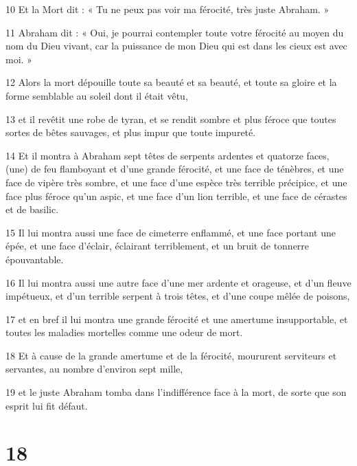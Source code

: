 \par 10 Et la Mort dit : « Tu ne peux pas voir ma férocité, très juste Abraham. »

\par 11 Abraham dit : « Oui, je pourrai contempler toute votre férocité au moyen du nom du Dieu vivant, car la puissance de mon Dieu qui est dans les cieux est avec moi. »

\par 12 Alors la mort dépouille toute sa beauté et sa beauté, et toute sa gloire et la forme semblable au soleil dont il était vêtu,

\par 13 et il revêtit une robe de tyran, et se rendit sombre et plus féroce que toutes sortes de bêtes sauvages, et plus impur que toute impureté.

\par 14 Et il montra à Abraham sept têtes de serpents ardentes et quatorze faces, (une) de feu flamboyant et d'une grande férocité, et une face de ténèbres, et une face de vipère très sombre, et une face d'une espèce très terrible précipice, et une face plus féroce qu'un aspic, et une face d'un lion terrible, et une face de cérastes et de basilic.

\par 15 Il lui montra aussi une face de cimeterre enflammé, et une face portant une épée, et une face d'éclair, éclairant terriblement, et un bruit de tonnerre épouvantable.

\par 16 Il lui montra aussi une autre face d'une mer ardente et orageuse, et d'un fleuve impétueux, et d'un terrible serpent à trois têtes, et d'une coupe mêlée de poisons,

\par 17 et en bref il lui montra une grande férocité et une amertume insupportable, et toutes les maladies mortelles comme une odeur de mort.

\par 18 Et à cause de la grande amertume et de la férocité, moururent serviteurs et servantes, au nombre d'environ sept mille,

\par 19 et le juste Abraham tomba dans l'indifférence face à la mort, de sorte que son esprit lui fit défaut.

\chapter{18}

